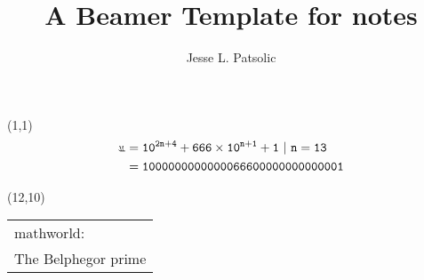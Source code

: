 \documentclass[xcolor=dvipsnames, aspectratio=169]{beamer}
\title[Daily Notes]{A Beamer Template for notes}
\subtitle[]{}
\author[JLP]{Jesse L. Patsolic}
\newcommand\rotpi{\rotatebox[origin=c]{180}{$\mathtt{\pi}$}}
\newcommand\copi{\reflectbox{\rotpi}}
\begin{document}
\begin{frame}[plain]
\begin{textblock}{3}(1,1)
    \hfill
    {\color{DarkRed}
    \huge{
	\begin{align*}
	    \copi &= \mathtt{10^{2n+4} + 666 \times 10^{n+1} + 1\ |\ n=13}\\
	    &= \mathtt{1000000000000066600000000000001}
	\end{align*}
    }
}
    \hfill
\end{textblock}

\begin{textblock}{3.25}(12,10)
    \hspace{1mm}
	{\color{black!70}
	}\\%
	{\color{black!70}
	{\small
	\begin{tabular}{l}
	mathworld:\\ 
	The Belphegor prime
	\end{tabular}
	}
	}
\end{textblock}
\end{frame}
\end{document}
